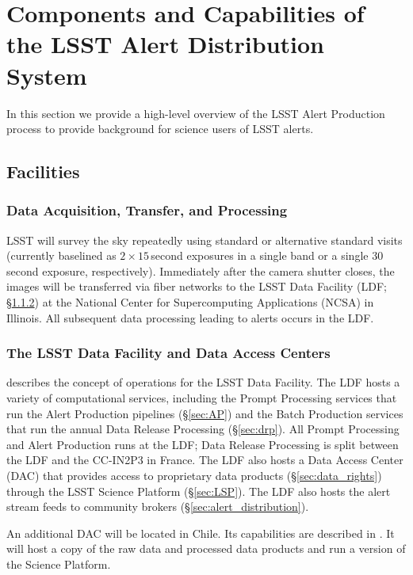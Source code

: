 \section{Components and Capabilities of the LSST Alert Distribution System}\label{sec:components}

In this section we provide a high-level overview of the LSST Alert Production process to provide background for science users of LSST alerts.

\subsection{Facilities}

\subsubsection{Data Acquisition, Transfer, and Processing}

LSST will survey the sky repeatedly using standard or alternative standard visits (currently baselined as $2\times15$\,second exposures in a single band or a single 30\,second exposure, respectively).
Immediately after the camera shutter closes, the images will be transferred via fiber networks to the LSST Data Facility (LDF; \S \ref{sec:LDF}) at the National Center for Supercomputing Applications (NCSA) in Illinois.
All subsequent data processing leading to alerts occurs in the LDF.

\subsubsection{The LSST Data Facility and Data Access Centers} \label{sec:LDF}

 describes the concept of operations for the LSST Data Facility.
The LDF hosts a variety of computational services, including the Prompt Processing services that run the Alert Production pipelines (\S \ref{sec:AP}) and the Batch Production services that run the annual Data Release Processing (\S \ref{sec:drp}).
All Prompt Processing and Alert Production runs at the LDF;
Data Release Processing is split between the LDF and the CC-IN2P3 in France.
The LDF also hosts a Data Access Center (DAC) that provides access to proprietary data products (\S \ref{sec:data_rights}) through the LSST Science Platform (\S \ref{sec:LSP}).
The LDF also hosts the alert stream feeds to community brokers (\S \ref{sec:alert_distribution}).

An additional DAC will be located in Chile.
Its capabilities are described in .
It will host a copy of the raw data and processed data products and run a version of the Science Platform.

